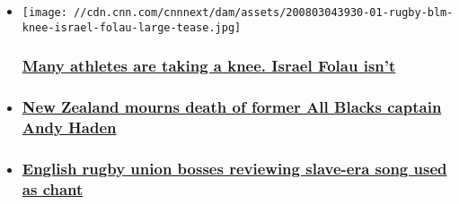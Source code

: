 \begin{itemize}
\item
  \href{/2020/08/03/sport/israel-folau-kneeling-super-league-spt-intl/index.html}{}

  \texttt{[image: //cdn.cnn.com/cnnnext/dam/assets/200803043930-01-rugby-blm-knee-israel-folau-large-tease.jpg]}

  \hypertarget{many-athletes-are-taking-a-knee-israel-folau-isnt}{%
  \subsubsection{\texorpdfstring{\href{/2020/08/03/sport/israel-folau-kneeling-super-league-spt-intl/index.html}{Many
  athletes are taking a knee. Israel Folau
  isn't}}{Many athletes are taking a knee. Israel Folau isn't}}\label{many-athletes-are-taking-a-knee-israel-folau-isnt}}
\item
  \hypertarget{new-zealand-mourns-death-of-former-all-blacks-captain-andy-haden}{%
  \subsubsection{\texorpdfstring{\href{/2020/07/29/sport/andy-haden-death-new-zealand-rugby-all-blacks-spt-intl/index.html}{New
  Zealand mourns death of former All Blacks captain Andy
  Haden}}{New Zealand mourns death of former All Blacks captain Andy Haden}}\label{new-zealand-mourns-death-of-former-all-blacks-captain-andy-haden}}
\item
  \hypertarget{english-rugby-union-bosses-reviewing-slave-era-song-used-as-chant}{%
  \subsubsection{\texorpdfstring{\href{/2020/06/19/sport/swing-low-chant-england-rugby-slavery-gbr-spt-intl/index.html}{English
  rugby union bosses reviewing slave-era song used as
  chant}}{English rugby union bosses reviewing slave-era song used as chant}}\label{english-rugby-union-bosses-reviewing-slave-era-song-used-as-chant}}
\end{itemize}

